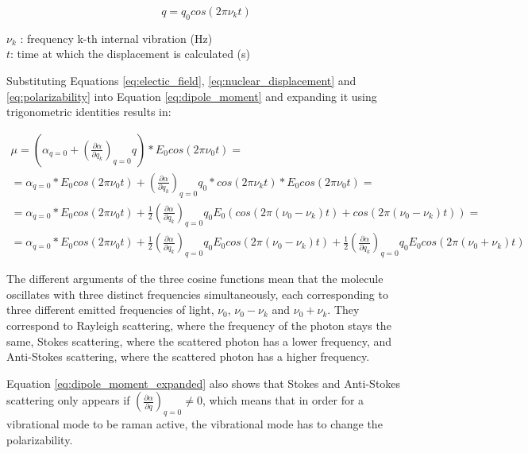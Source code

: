 \begin{equation} \label{eq:nuclear_displacement}
   q=q_0cos(2\pi\nu_kt)
\end{equation}


\(\nu_k \) : frequency k-th internal vibration (\unit{\hertz}) \\
\(t\): time at which the displacement is calculated (\unit{\second})


\bigskip 

Substituting Equations \ref{eq:electic_field}, \ref{eq:nuclear_displacement} and \ref{eq:polarizability} into Equation \ref{eq:dipole_moment} and expanding it using trigonometric identities results in:

\begin{multline} \label{eq:dipole_moment_expanded}
    \mu = (\alpha_{q=0} + \left( \frac{\partial\alpha}{\partial q_k}\right)_{q=0}q)*E_0cos(2\pi\nu_0t) = \\
    = \alpha_{q=0}*E_0cos(2\pi\nu_0t) +  \left( \frac{\partial\alpha}{\partial q_k}\right)_{q=0}q_0*cos(2\pi\nu_kt)*E_0cos(2\pi\nu_0t)=\\
    =\alpha_{q=0}*E_0cos(2\pi\nu_0t) + \frac{1}{2} \left( \frac{\partial\alpha}{\partial q_k}\right)_{q=0}q_0E_0\left(cos(2\pi(\nu_0-\nu_k)t)+cos(2\pi(\nu_0-\nu_k)t)\right)= \\
    =\alpha_{q=0}*E_0cos(2\pi\nu_0t)+\frac{1}{2} \left( \frac{\partial\alpha}{\partial q_k}\right)_{q=0}q_0E_0cos(2\pi(\nu_0-\nu_k)t) + \frac{1}{2} \left( \frac{\partial\alpha}{\partial q_k}\right)_{q=0}q_0E_0cos(2\pi(\nu_0+\nu_k)t)
\end{multline}

The different arguments of the three cosine functions mean that the molecule oscillates with three distinct frequencies simultaneously, each corresponding to three different emitted frequencies of light, \(\nu_0\), \(\nu_0-\nu_k\) and \(\nu_0+\nu_k\). They correspond to Rayleigh scattering, where the frequency of the photon stays the same, Stokes scattering, where the scattered photon has a lower frequency, and Anti-Stokes scattering, where the scattered photon has a higher frequency.\cite{theory1} 

\bigskip

Equation \ref{eq:dipole_moment_expanded} also shows that Stokes and Anti-Stokes scattering only appears if \((\frac{\partial\alpha}{\partial q})_{q=0}\neq 0\), which means that in order for a vibrational mode to be raman active, the vibrational mode has to change the polarizability.


